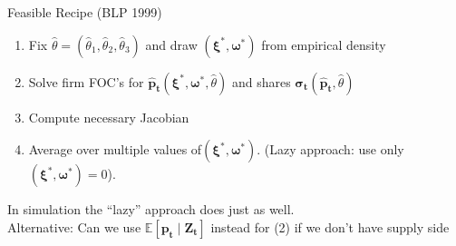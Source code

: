 \documentclass[aspectratio=169,10pt]{beamer}
\begin{document}



\begin{frame}{Feasible Recipe (BLP 1999)}
\begin{enumerate}
\item Fix $\widehat{\theta}=(\widehat{\theta}_1,\widehat{\theta}_2,\widehat{\theta}_3)$ and draw $(\symbf{\xi}^{*},\symbf{\omega}^{*})$ from empirical density
\item Solve firm FOC's for $\symbf{\hat{p}_{t}}(\symbf{\xi}^{*},\symbf{\omega}^{*},\widehat{\theta})$ and shares $\symbf{\sigma_{t}}(\symbf{\hat{p}_{t}},\widehat{\theta})$
\item Compute necessary Jacobian
\item Average over multiple values of$(\symbf{\xi}^{*},\symbf{\omega}^{*})$. (Lazy approach: use only $(\symbf{\xi}^{*},\symbf{\omega}^{*})=0$).
\end{enumerate}
In simulation the ``lazy'' approach does just as well.\\

 Alternative: Can we use $\mathbb{E}[ \symbf{p_t} \mid \symbf{Z_t}]$ instead for (2) if we don't have supply side
\end{frame}
\end{document}

